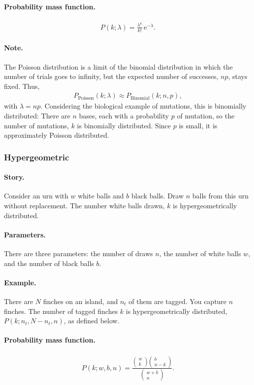 \paragraph{Probability mass function.}
\begin{align}
P(k;\lambda) = \frac{\lambda^k}{k!}\,\mathrm{e}^{-\lambda}.
\end{align}
\paragraph{Note.}
The Poisson distribution is a limit of the binomial distribution in
which the number of trials goes to infinity, but the expected number
of successes, $np$, stays fixed.  Thus, 
\begin{align}
P_\mathrm{Poisson}(k;\lambda) \approx P_\mathrm{Binomial}(k;n, p),
\end{align}
with $\lambda = np$.  Considering the biological example of mutations,
this is binomially distributed: There are $n$ bases, each with a
probability $p$ of mutation, so the number of mutations, $k$ is
binomially distributed.  Since $p$ is small, it is approximately
Poisson distributed.


\subsubsection{Hypergeometric}
\paragraph{Story.} Consider an urn with $w$ white balls and $b$ black
balls.  Draw $n$ balls from this urn without replacement.  The number
white balls drawn, $k$ is hypergeometrically distributed.
\paragraph{Parameters.} There are three parameters: the number of
draws $n$, the number of white balls $w$, and the number of black
balls $b$.
\paragraph{Example.} There are $N$ finches on an island, and $n_t$ of
them are tagged.  You capture $n$ finches.  The number of tagged
finches $k$ is hypergeometrically distributed, $P(k;n_t, N-n_t, n)$,
as defined below.
\paragraph{Probability mass function.}
\begin{align}
P(k;w, b, n) = \frac{\begin{pmatrix}w\\k\end{pmatrix}\begin{pmatrix}b\\n-k\end{pmatrix}}
{\begin{pmatrix}w+b\\n\end{pmatrix}}.
\end{align}
